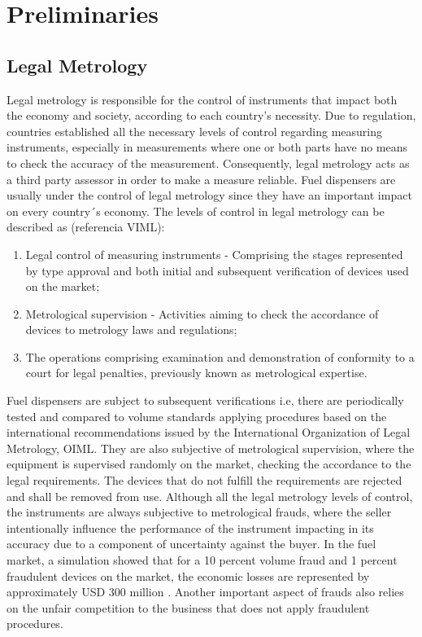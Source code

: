 \documentclass[sigplan]{acmart}
\begin{document}
\section{Preliminaries}

\subsection{Legal Metrology}

Legal metrology is responsible for the control of instruments that impact both the economy and society, according to each country's necessity. Due to regulation, countries established all the necessary levels of control regarding measuring instruments, especially in measurements where one or both parts have no means to check the accuracy of the measurement. Consequently, legal metrology acts as a third party assessor in order to make a measure reliable. Fuel dispensers are usually under the control of legal metrology since they have an important impact on every country´s economy. The levels of control in legal metrology can be described as (referencia VIML):

\begin{enumerate}

 \item Legal control of measuring instruments - Comprising the stages represented by type approval and both initial and subsequent verification of devices used on the market;
 \item Metrological supervision - Activities aiming to check the accordance of devices to metrology laws and regulations;
 \item The operations comprising examination and demonstration of conformity to a court for legal penalties, previously known as metrological expertise.

\end{enumerate}

Fuel dispensers are subject to subsequent verifications i.e, there are periodically tested and compared to volume standards applying procedures based on the international recommendations issued by the International Organization of Legal Metrology, OIML. 
They are also subjective of metrological supervision, where the equipment is supervised randomly on the market, checking the accordance to the legal requirements. The devices that do not fulfill the requirements are rejected and shall be removed from use.
Although all the legal metrology levels of control, the instruments are always subjective to metrological frauds, where the seller intentionally influence the performance of the instrument impacting in its accuracy due to a component of uncertainty against the buyer. In the fuel market, a simulation showed that for a 10 percent volume fraud and  1 percent fraudulent devices on the market, the economic losses are represented by approximately USD 300 million \citep{RodriguesFilho2016}. Another important aspect of frauds also relies on the unfair competition to the business that does not apply fraudulent procedures.
\end{document}
